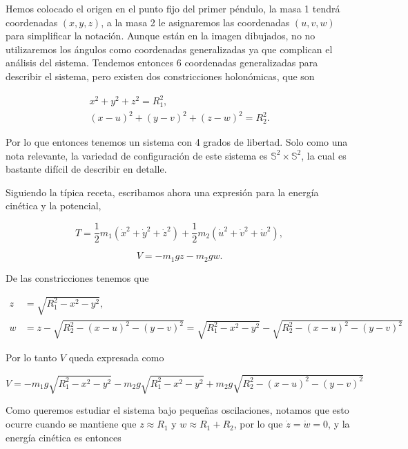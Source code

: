 \documentclass[a4paper,10pt]{article}
\numberwithin{equation}{section}
\begin{document}
Hemos colocado el origen en el punto fijo del primer péndulo, la masa 1 tendrá 
coordenadas $(x,y,z)$, a la masa 2 le asignaremos las coordenadas 
$(u,v,w)$ para simplificar la notación. Aunque están en la imagen dibujados, no 
no utilizaremos los ángulos como coordenadas generalizadas ya que complican 
el análisis del sistema. Tendemos entonces 6 coordenadas generalizadas para 
describir el sistema, pero existen dos constricciones holonómicas, que son 

\begin{align}
 x^2 + y^2 + z^2 = R_1^2, \\
 (x - u)^2 + (y-v)^2 + (z-w)^2 = R_2^2.
\end{align}

Por lo que entonces tenemos un sistema con 4 grados de libertad. Solo como una nota relevante, 
la variedad de configuración de este sistema es $\mathbb{S}^2 \times \mathbb{S}^2$, 
la cual es bastante difícil de describir en detalle.

\vspace{.3cm}

Siguiendo la típica receta, escribamos ahora una expresión para la energía cinética y 
la potencial,

\begin{equation}
 T = \frac{1}{2}m_1(\dot{x}^2+\dot{y}^2+\dot{z}^2) 
 + \frac{1}{2}m_2(\dot{u}^2+\dot{v}^2+\dot{w}^2),
\end{equation}

\begin{equation}
 V = - m_1gz - m_2gw.
\end{equation}

De las constricciones tenemos que 

\begin{align*}
 z &= \sqrt{R_1^2 - x^2 - y^2}, \\
 w &= z - \sqrt{R_2^2 - (x-u)^2 - (y-v)^2} = \sqrt{R_1^2 - x^2 - y^2} - 
 \sqrt{R_2^2 - (x-u)^2 - (y-v)^2}
\end{align*}

Por lo tanto $V$ queda expresada como 

\begin{equation}
 V = - m_1g\sqrt{R_1^2 - x^2 - y^2} - m_2g\sqrt{R_1^2 - x^2 - y^2} + 
 m_2 g  \sqrt{R_2^2 - (x-u)^2 - (y-v)^2}
 \label{eq:energPotenDoble}
\end{equation}

Como queremos estudiar el sistema bajo pequeñas oscilaciones, notamos que esto ocurre 
cuando se mantiene que $z \approx R_1$ y $w \approx R_1 + R_2$, por lo que $\dot{z} = 
\dot{w} = 0$, y la energía cinética es entonces 
\end{document}
